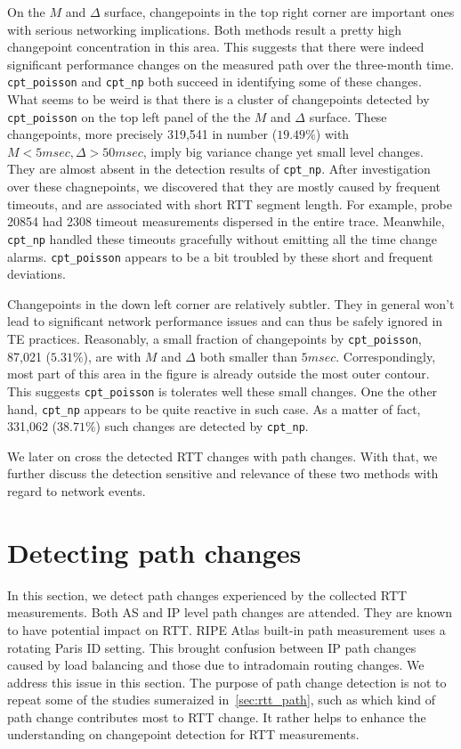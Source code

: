 On the $M$ and $\Delta$ surface, changepoints in the top right corner are important ones with serious networking implications.
Both methods result a pretty high changepoint concentration in this area.
This suggests that there were indeed significant performance changes on the measured path over the three-month time.
\texttt{cpt\_poisson} and \texttt{cpt\_np} both succeed in identifying some of these changes.
What seems to be weird is that there is a cluster of changepoints detected by \texttt{cpt\_poisson} on the top left panel of the the $M$ and $\Delta$ surface.
These changepoints, more precisely 319,541 in number ($19.49\%$) with $M<5msec, \Delta>50msec$, imply big variance change yet small level changes.
They are almost absent in the detection results of \texttt{cpt\_np}.
After investigation over these chagnepoints, we discovered that they are mostly caused by frequent timeouts, and are associated with short RTT segment length. For example, probe 20854 had 2308 timeout measurements dispersed in the entire trace.
Meanwhile, \texttt{cpt\_np} handled these timeouts gracefully without emitting all the time change alarms.
\texttt{cpt\_poisson} appears to be a bit troubled by these short and frequent deviations.

Changepoints in the down left corner are relatively subtler.
They in general won't lead to significant network performance issues and can thus be safely ignored in TE practices.
Reasonably, a small fraction of changepoints by \texttt{cpt\_poisson}, 87,021 ($5.31\%$), are with $M$ and $\Delta$ both smaller than $5msec$.
Correspondingly, most part of this area in the figure is already outside the most outer contour.
This suggests \texttt{cpt\_poisson} is tolerates well these small changes.
One the other hand, \texttt{cpt\_np} appears to be quite reactive in such case.
As a matter of fact, 331,062 ($38.71\%$) such changes are detected by \texttt{cpt\_np}.

We later on cross the detected RTT changes with path changes.
With that, we further discuss the detection sensitive and relevance of these two methods with regard to network events.

\section{Detecting path changes}
\label{sec:path}

In this section, we detect path changes experienced by the collected RTT measurements.
Both AS and IP level path changes are attended.
They are known to have potential impact on RTT.
RIPE Atlas built-in path measurement uses a rotating Paris ID setting.
This brought confusion between IP path changes caused by load balancing and those due to intradomain routing changes.
We address this issue in this section.
The purpose of path change detection is not to repeat some of the studies sumeraized in~\ref{sec:rtt_path}, 
such as which kind of path change contributes most to RTT change.
It rather helps to enhance the understanding on changepoint detection for RTT measurements.


